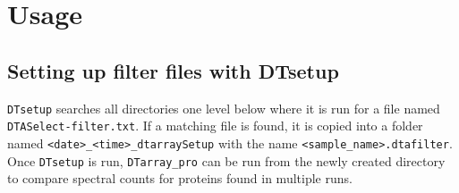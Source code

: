 \documentclass[12pt]{article}
\begin{document}
		
		
		
		
		
		
		
		
		
	
	
	\section{Usage}
	
	\subsection{Setting up filter files with DTsetup} \label{sec:dtsetup}
	
	\texttt{DTsetup} searches all directories one level below where it is run for a file named \texttt{DTASelect-filter.txt}. If a matching file is found, it is copied into a folder named \texttt{<date>\_<time>\_dtarraySetup} with the name \texttt{<sample\_name>.dtafilter}. Once \texttt{DTsetup} is run, \texttt{DTarray\_pro} can be run from the newly created directory to compare spectral counts for proteins found in multiple runs.
	
\end{document}
